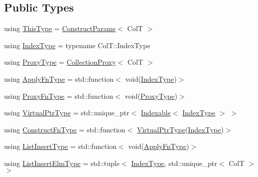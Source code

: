 \subsection*{Public Types}
\begin{DoxyCompactItemize}
\item 
using \hyperlink{structvt_1_1vrt_1_1collection_1_1param_1_1_construct_params_a13d4910c0f6825c7b0ddfebce5288bea}{This\+Type} = \hyperlink{structvt_1_1vrt_1_1collection_1_1param_1_1_construct_params}{Construct\+Params}$<$ ColT $>$
\item 
using \hyperlink{structvt_1_1vrt_1_1collection_1_1param_1_1_construct_params_a7bc8d5d57e377e0f2e60031582eeb7e6}{Index\+Type} = typename Col\+T\+::\+Index\+Type
\item 
using \hyperlink{structvt_1_1vrt_1_1collection_1_1param_1_1_construct_params_a837fb2b2a036f898fb65da72d3ee2fb0}{Proxy\+Type} = \hyperlink{structvt_1_1vrt_1_1collection_1_1_collection_proxy}{Collection\+Proxy}$<$ ColT $>$
\item 
using \hyperlink{structvt_1_1vrt_1_1collection_1_1param_1_1_construct_params_a4275ecc44239ac1aeedea9d31e93c78f}{Apply\+Fn\+Type} = std\+::function$<$ void(\hyperlink{structvt_1_1vrt_1_1collection_1_1param_1_1_construct_params_a7bc8d5d57e377e0f2e60031582eeb7e6}{Index\+Type})$>$
\item 
using \hyperlink{structvt_1_1vrt_1_1collection_1_1param_1_1_construct_params_ae1b51eac652fafee85f4c370e2c3b585}{Proxy\+Fn\+Type} = std\+::function$<$ void(\hyperlink{structvt_1_1vrt_1_1collection_1_1param_1_1_construct_params_a837fb2b2a036f898fb65da72d3ee2fb0}{Proxy\+Type})$>$
\item 
using \hyperlink{structvt_1_1vrt_1_1collection_1_1param_1_1_construct_params_ac3715f51f35c3ce6357ef3e9547beb73}{Virtual\+Ptr\+Type} = std\+::unique\+\_\+ptr$<$ \hyperlink{structvt_1_1vrt_1_1collection_1_1_indexable}{Indexable}$<$ \hyperlink{structvt_1_1vrt_1_1collection_1_1param_1_1_construct_params_a7bc8d5d57e377e0f2e60031582eeb7e6}{Index\+Type} $>$ $>$
\item 
using \hyperlink{structvt_1_1vrt_1_1collection_1_1param_1_1_construct_params_a7ad7bdf4220701e54b485f45e08b1736}{Construct\+Fn\+Type} = std\+::function$<$ \hyperlink{structvt_1_1vrt_1_1collection_1_1param_1_1_construct_params_ac3715f51f35c3ce6357ef3e9547beb73}{Virtual\+Ptr\+Type}(\hyperlink{structvt_1_1vrt_1_1collection_1_1param_1_1_construct_params_a7bc8d5d57e377e0f2e60031582eeb7e6}{Index\+Type})$>$
\item 
using \hyperlink{structvt_1_1vrt_1_1collection_1_1param_1_1_construct_params_aabef3a4ec2a70d29d2b5161daf66e153}{List\+Insert\+Type} = std\+::function$<$ void(\hyperlink{structvt_1_1vrt_1_1collection_1_1param_1_1_construct_params_a4275ecc44239ac1aeedea9d31e93c78f}{Apply\+Fn\+Type})$>$
\item 
using \hyperlink{structvt_1_1vrt_1_1collection_1_1param_1_1_construct_params_ac04e58216ca54c39b91f15f6bb46afc9}{List\+Insert\+Elm\+Type} = std\+::tuple$<$ \hyperlink{structvt_1_1vrt_1_1collection_1_1param_1_1_construct_params_a7bc8d5d57e377e0f2e60031582eeb7e6}{Index\+Type}, std\+::unique\+\_\+ptr$<$ ColT $>$ $>$
\end{DoxyCompactItemize}
